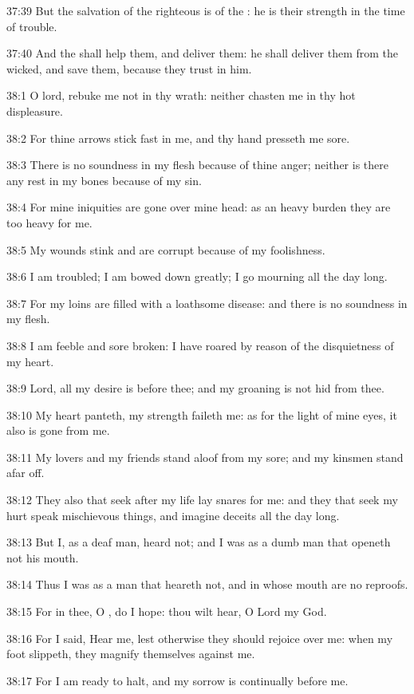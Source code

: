 37:39 But the salvation of the righteous is of the \LORD: he is their strength in the time of trouble.

37:40 And the \LORD shall help them, and deliver them: he shall deliver them from the wicked, and save them, because they trust in him.



38:1 O lord, rebuke me not in thy wrath: neither chasten me in thy hot displeasure.

38:2 For thine arrows stick fast in me, and thy hand presseth me sore.

38:3 There is no soundness in my flesh because of thine anger; neither is there any rest in my bones because of my sin.

38:4 For mine iniquities are gone over mine head: as an heavy burden they are too heavy for me.

38:5 My wounds stink and are corrupt because of my foolishness.

38:6 I am troubled; I am bowed down greatly; I go mourning all the day long.

38:7 For my loins are filled with a loathsome disease: and there is no soundness in my flesh.

38:8 I am feeble and sore broken: I have roared by reason of the disquietness of my heart.

38:9 Lord, all my desire is before thee; and my groaning is not hid from thee.

38:10 My heart panteth, my strength faileth me: as for the light of mine eyes, it also is gone from me.

38:11 My lovers and my friends stand aloof from my sore; and my kinsmen stand afar off.

38:12 They also that seek after my life lay snares for me: and they that seek my hurt speak mischievous things, and imagine deceits all the day long.

38:13 But I, as a deaf man, heard not; and I was as a dumb man that openeth not his mouth.

38:14 Thus I was as a man that heareth not, and in whose mouth are no reproofs.

38:15 For in thee, O \LORD, do I hope: thou wilt hear, O Lord my God.

38:16 For I said, Hear me, lest otherwise they should rejoice over me: when my foot slippeth, they magnify themselves against me.

38:17 For I am ready to halt, and my sorrow is continually before me.

